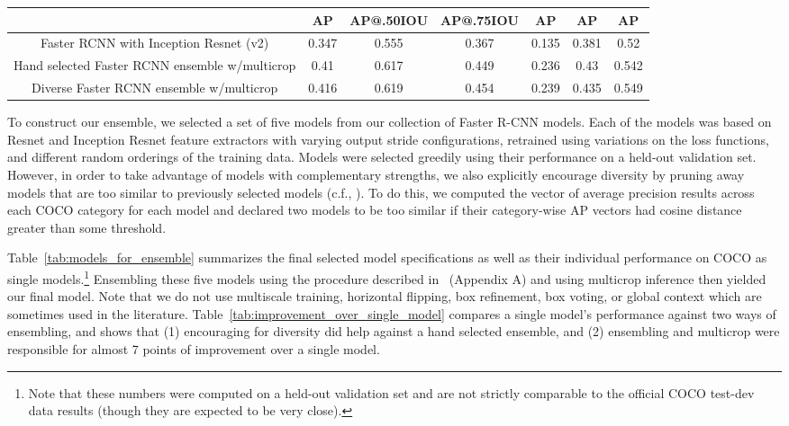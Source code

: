 \documentclass[10pt,twocolumn,letterpaper]{article}
\begin{document}
\begin{table*}[t!]
\begin{center}
{\footnotesize
\begin{tabular}{c|c|c|c|c|c|c}
\, & AP & AP@.50IOU & AP@.75IOU & AP & AP & AP \\
\hline
Faster RCNN with Inception Resnet (v2) & 0.347  & 0.555 & 0.367 &0.135 & 0.381  & 0.52 \\
Hand selected Faster RCNN ensemble w/multicrop & 0.41 & 0.617 & 0.449 & 0.236 & 0.43 & 0.542 \\
Diverse Faster RCNN ensemble w/multicrop & 0.416 & 0.619 & 0.454 & 0.239 & 0.435 & 0.549
\end{tabular}
}
\caption{
\footnotesize Effects of ensembling and multicrop inference.  Numbers reported on COCO test-dev dataset.
Second row (hand selected ensemble) consists of 6 Faster RCNN models
with 3 Resnet 101 (v1) and 3 Inception Resnet (v2) and the third row
(diverse ensemble) is described in detail in
Table~\ref{tab:models_for_ensemble}. 
}
\label{tab:improvement_over_single_model}
\end{center}
\end{table*}

To construct our ensemble, we selected a set of five models from our
collection of Faster R-CNN models.  Each of the models was based on
Resnet and Inception Resnet feature extractors with varying output
stride configurations, retrained using variations on the loss
functions, and different random orderings of the training data.
Models were selected greedily using their performance on a held-out
validation set.  However, in order to take advantage of models with
complementary strengths, we also explicitly encourage diversity by
pruning away models that are too similar to previously selected
models (c.f., \cite{Lee2015diverse}).
To do this, we computed the vector of average precision
results across each COCO category for each model and declared two
models to be too similar if their category-wise AP vectors had cosine
distance greater than some threshold.

Table~\ref{tab:models_for_ensemble} summarizes the final selected
model specifications as well as their individual performance on COCO
as single models.\footnote{Note that these numbers were computed on a
  held-out validation set and are not strictly comparable to the
  official COCO test-dev data results (though they are expected to be
  very close).}  Ensembling these five models using the procedure
described in~\cite{he2015deep} (Appendix A) and using multicrop
inference then yielded our final model.  Note that we do not use
multiscale training, horizontal flipping, box refinement, box voting,
or global context which are sometimes used in the literature.
Table~\ref{tab:improvement_over_single_model} compares a single
model's performance against two ways of ensembling, and shows that (1)
encouraging for diversity did help against a hand selected ensemble,
and (2) ensembling and multicrop were responsible for almost 7 points
of improvement over a single model.
\end{document}

